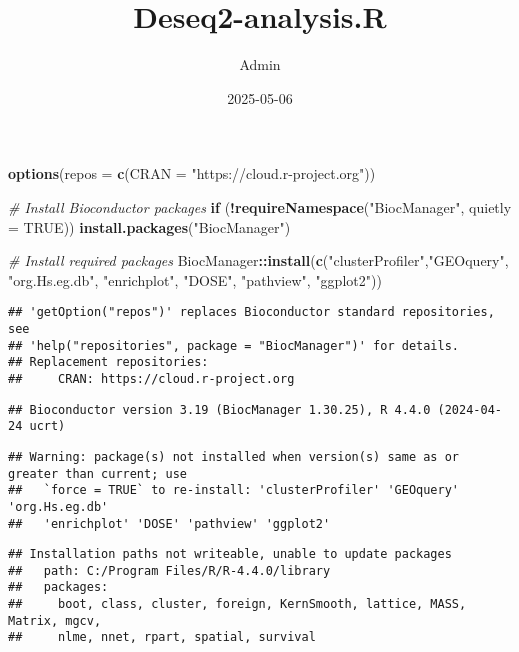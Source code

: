 \documentclass[
]{article}
\title{Deseq2-analysis.R}
\author{Admin}
\date{2025-05-06}
\newenvironment{Shaded}{\begin{snugshade}}{\end{snugshade}}
\newcommand{\AttributeTok}[1]{\textcolor[rgb]{0.13,0.29,0.53}{#1}}
\newcommand{\CommentTok}[1]{\textcolor[rgb]{0.56,0.35,0.01}{\textit{#1}}}
\newcommand{\ConstantTok}[1]{\textcolor[rgb]{0.56,0.35,0.01}{#1}}
\newcommand{\ControlFlowTok}[1]{\textcolor[rgb]{0.13,0.29,0.53}{\textbf{#1}}}
\newcommand{\FunctionTok}[1]{\textcolor[rgb]{0.13,0.29,0.53}{\textbf{#1}}}
\newcommand{\NormalTok}[1]{#1}
\newcommand{\SpecialCharTok}[1]{\textcolor[rgb]{0.81,0.36,0.00}{\textbf{#1}}}
\newcommand{\StringTok}[1]{\textcolor[rgb]{0.31,0.60,0.02}{#1}}
\begin{document}
\maketitle

\begin{Shaded}
\begin{Highlighting}[]
\FunctionTok{options}\NormalTok{(}\AttributeTok{repos =} \FunctionTok{c}\NormalTok{(}\AttributeTok{CRAN =} \StringTok{"https://cloud.r{-}project.org"}\NormalTok{))}

\CommentTok{\# Install Bioconductor packages}
\ControlFlowTok{if}\NormalTok{ (}\SpecialCharTok{!}\FunctionTok{requireNamespace}\NormalTok{(}\StringTok{"BiocManager"}\NormalTok{, }\AttributeTok{quietly =} \ConstantTok{TRUE}\NormalTok{))}
  \FunctionTok{install.packages}\NormalTok{(}\StringTok{"BiocManager"}\NormalTok{)}

\CommentTok{\# Install required packages}
\NormalTok{BiocManager}\SpecialCharTok{::}\FunctionTok{install}\NormalTok{(}\FunctionTok{c}\NormalTok{(}\StringTok{"clusterProfiler"}\NormalTok{,}\StringTok{"GEOquery"}\NormalTok{,  }\StringTok{"org.Hs.eg.db"}\NormalTok{, }\StringTok{"enrichplot"}\NormalTok{, }\StringTok{"DOSE"}\NormalTok{, }\StringTok{"pathview"}\NormalTok{, }\StringTok{"ggplot2"}\NormalTok{))}
\end{Highlighting}
\end{Shaded}

\begin{verbatim}
## 'getOption("repos")' replaces Bioconductor standard repositories, see
## 'help("repositories", package = "BiocManager")' for details.
## Replacement repositories:
##     CRAN: https://cloud.r-project.org
\end{verbatim}

\begin{verbatim}
## Bioconductor version 3.19 (BiocManager 1.30.25), R 4.4.0 (2024-04-24 ucrt)
\end{verbatim}

\begin{verbatim}
## Warning: package(s) not installed when version(s) same as or greater than current; use
##   `force = TRUE` to re-install: 'clusterProfiler' 'GEOquery' 'org.Hs.eg.db'
##   'enrichplot' 'DOSE' 'pathview' 'ggplot2'
\end{verbatim}

\begin{verbatim}
## Installation paths not writeable, unable to update packages
##   path: C:/Program Files/R/R-4.4.0/library
##   packages:
##     boot, class, cluster, foreign, KernSmooth, lattice, MASS, Matrix, mgcv,
##     nlme, nnet, rpart, spatial, survival
\end{verbatim}
\end{document}
